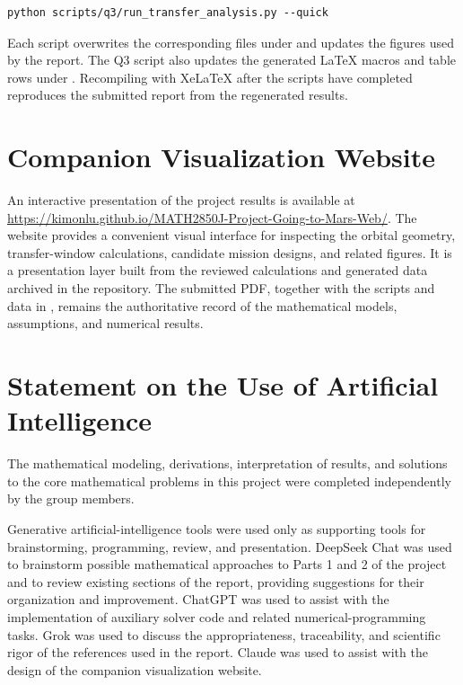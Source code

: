 \documentclass[11pt,a4paper]{article}
\begin{document}
\begin{lstlisting}[basicstyle=\ttfamily\small]
python scripts/q3/run_transfer_analysis.py --quick
\end{lstlisting}

Each script overwrites the corresponding files under  and
updates the figures used by the report. The Q3 script also updates the generated
LaTeX macros and table rows under . Recompiling
 with XeLaTeX after the scripts have completed reproduces the
submitted report from the regenerated results.

\section{Companion Visualization Website}
\label{app:website}

An interactive presentation of the project results is available at
\url{https://kimonlu.github.io/MATH2850J-Project-Going-to-Mars-Web/}. The website
provides a convenient visual interface for inspecting the orbital geometry,
transfer-window calculations, candidate mission designs, and related figures.
It is a presentation layer built from the reviewed calculations and generated
data archived in the repository. The submitted PDF, together with the scripts
and data in , remains the authoritative record of the mathematical
models, assumptions, and numerical results.

\section{Statement on the Use of Artificial Intelligence}
\label{app:ai-use}

The mathematical modeling, derivations, interpretation of results, and
solutions to the core mathematical problems in this project were completed
independently by the group members.

Generative artificial-intelligence tools were used only as supporting tools for
brainstorming, programming, review, and presentation. DeepSeek Chat was used to
brainstorm possible mathematical approaches to Parts 1 and 2 of the project and
to review existing sections of the report, providing suggestions for their
organization and improvement. ChatGPT was used to assist with the implementation
of auxiliary solver code and related numerical-programming tasks. Grok was used
to discuss the appropriateness, traceability, and scientific rigor of the
references used in the report. Claude was used to assist with the design of the
companion visualization website.
\end{document}
